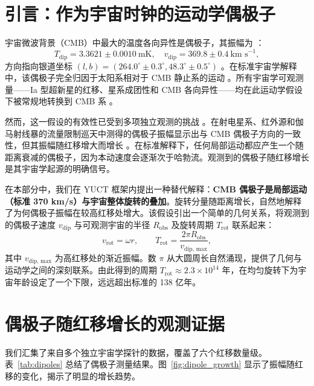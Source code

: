\documentclass[11pt,a4paper]{article}
\begin{document}
	\section{引言：作为宇宙时钟的运动学偶极子}
	
	宇宙微波背景（CMB）中最大的温度各向异性是偶极子，其振幅为 \cite{Planck2018VI, Planck2018VII}：
	\begin{equation}
		T_{\text{dip}} = 3.3621 \pm 0.0010\ \text{mK}, \quad v_{\text{dip}} = 369.8 \pm 0.4\ \text{km s}^{-1},
	\end{equation}
	方向指向银道坐标 \((l,b) = (264.0^\circ \pm 0.3^\circ, 48.3^\circ \pm 0.5^\circ)\) \cite{Planck2018I}。在标准宇宙学解释中，该偶极子完全归因于太阳系相对于 CMB 静止系的运动 \cite{PlanckIntLVI}。所有宇宙学可观测量——Ia 型超新星的红移、星系成团性和 CMB 各向异性——均在此运动学假设下被常规地转换到 CMB 系 \cite{Planck2018V,Planck2018VI}。
	
	然而，这一假设的有效性已受到多项独立观测的挑战 \cite{Gibelyou2012, Yoon2014}。在射电星系、红外源和伽马射线暴的流量限制巡天中测得的偶极子振幅显示出与 CMB 偶极子方向的一致性，但其振幅随红移增大而增长 \cite{Bengaly2017, Siewert2021, Colin2017, Secrest2025}。在标准解释下，任何局部运动都应产生一个随距离衰减的偶极子，因为本动速度会逐渐次于哈勃流。观测到的偶极子随红移增长是其宇宙学起源的明确信号。
	
	在本部分中，我们在 YUCT 框架内提出一种替代解释：\textbf{CMB 偶极子是局部运动（标准 370 km/s）与宇宙整体旋转的叠加}。旋转分量随距离增长，自然地解释了为何偶极子振幅在较高红移处增大。该假设引出一个简单的几何关系，将观测到的偶极子速度 \(v_{\text{dip}}\) 与可观测宇宙的半径 \(R_{\text{obs}}\) 及旋转周期 \(T_{\text{rot}}\) 联系起来：
	\begin{equation}
		v_{\text{rot}} = \omega r, \qquad T_{\text{rot}} = \frac{2\pi R_{\text{obs}}}{v_{\text{dip, max}}},
	\end{equation}
	其中 \(v_{\text{dip, max}}\) 为高红移处的渐近振幅。数 \(\pi\) 从大圆周长自然涌现，提供了几何与运动学之间的深刻联系。由此得到的周期 \(T_{\text{rot}} \approx 2.3 \times 10^{14}\) 年，在均匀旋转下为宇宙年龄设定了一个下限，远远超出标准的 138 亿年。
	
	\section{偶极子随红移增长的观测证据}
	
	我们汇集了来自多个独立宇宙学探针的数据，覆盖了六个红移数量级。表~\ref{tab:dipoles} 总结了偶极子测量结果。图~\ref{fig:dipole_growth} 显示了振幅随红移的变化，揭示了明显的增长趋势。
	
\end{document}
